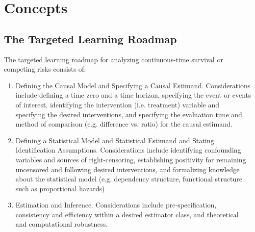 \documentclass{report}
\newcommand{\1}{\ensuremath{\mathbf{1}}}
\begin{document}
\section{Concepts}
\label{concepts}
\subsection{The Targeted Learning Roadmap}
\label{sec:org5aa1694}
The targeted learning roadmap for analyzing continuous-time survival or competing risks consists of:
\begin{enumerate}
  \item Defining the Causal Model and Specifying a Causal Estimand. Considerations include defining a time zero and a time horizon, specifying the event or events of interest, identifying the intervention (i.e. treatment) variable and specifying the desired interventions, and specifying the evaluation time and method of comparison (e.g. difference vs. ratio) for the causal estimand.
  \item Defining a Statistical Model and Statistical Estimand and Stating Identification Assumptions. Considerations include identifying confounding variables and sources of right-censoring, establishing positivity for remaining uncensored and following desired interventions, and formalizing knowledge about the statistical model (e.g. dependency structure, functional structure such as proportional hazards)
  \item Estimation and Inference. Considerations include pre-specification, consistency and efficiency within a desired estimator class, and theoretical and computational robustness.
\end{enumerate}
\end{document}
